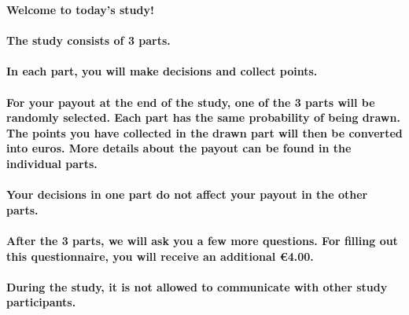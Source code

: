 \setlength{\parskip}{1em}
\textbf{Welcome to today's study!}

\noindent\paragraph{The study consists of 3 parts.}

\noindent \paragraph{In each part, you will make decisions and collect points.}

\noindent \paragraph{For your payout at the end of the study, one of the 3 parts will be randomly selected. Each part has the same probability of being drawn. The points you have collected in the drawn part will then be converted into euros. More details about the payout can be found in the individual parts.}

\noindent \paragraph{Your decisions in one part do not affect your payout in the other parts.}

\noindent \paragraph{After the 3 parts, we will ask you a few more questions. For filling out this questionnaire, you will receive an additional €4.00.}

\noindent \paragraph{During the study, it is not allowed to communicate with other study participants.}
